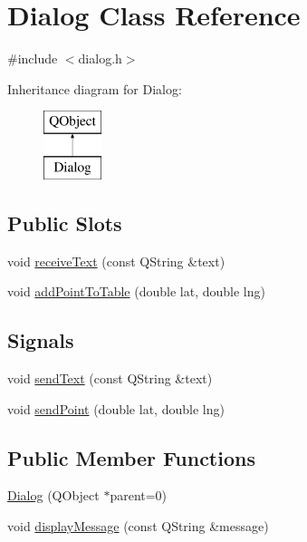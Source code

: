 \hypertarget{class_dialog}{}\section{Dialog Class Reference}
\label{class_dialog}


{\ttfamily \#include $<$dialog.\+h$>$}

Inheritance diagram for Dialog\+:\begin{figure}[H]
\begin{center}
\leavevmode
\includegraphics[height=2.000000cm]{class_dialog}
\end{center}
\end{figure}
\subsection*{Public Slots}
\begin{DoxyCompactItemize}
\item 
void \hyperlink{class_dialog_a937038eaea8c49ecbe7fb38fee63fd29}{receive\+Text} (const Q\+String \&text)
\item 
void \hyperlink{class_dialog_a4649de72d982f73ecaa9bef08a6282b4}{add\+Point\+To\+Table} (double lat, double lng)
\end{DoxyCompactItemize}
\subsection*{Signals}
\begin{DoxyCompactItemize}
\item 
void \hyperlink{class_dialog_a2c541f80e65d942ff6d471607a81fbbc}{send\+Text} (const Q\+String \&text)
\item 
void \hyperlink{class_dialog_ada82bdcc218632134d3907af12f0d567}{send\+Point} (double lat, double lng)
\end{DoxyCompactItemize}
\subsection*{Public Member Functions}
\begin{DoxyCompactItemize}
\item 
\hyperlink{class_dialog_a13476d9809dc62da93e9f36958d8ce69}{Dialog} (Q\+Object $\ast$parent=0)
\item 
void \hyperlink{class_dialog_ace9ced9197b21b73477e1dfe08ce0452}{display\+Message} (const Q\+String \&message)
\end{DoxyCompactItemize}
